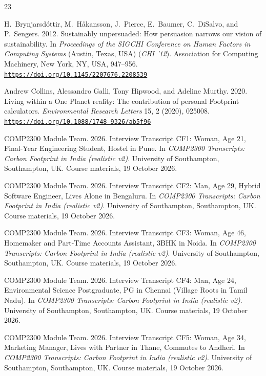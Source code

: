 \documentclass[12pt, a4paper]{article}
\newcommand{\doi}[1]{\href{https://doi.org/#1}{\nolinkurl{https://doi.org/#1}}}
\begin{document}
\begin{thebibliography}{23}
\footnotesize

H.~Brynjarsd\'{o}ttir, M.~H\aa kansson, J.~Pierce, E.~Baumer, C.~DiSalvo, and P.~Sengers. 2012. Sustainably unpersuaded: How persuasion narrows our vision of sustainability. In \textit{Proceedings of the SIGCHI Conference on Human Factors in Computing Systems} (Austin, Texas, USA) (\textit{CHI '12}). Association for Computing Machinery, New York, NY, USA, 947--956. \doi{10.1145/2207676.2208539}

Andrew Collins, Alessandro Galli, Tony Hipwood, and Adeline Murthy. 2020. Living within a One Planet reality: The contribution of personal Footprint calculators. \textit{Environmental Research Letters} 15, 2 (2020), 025008. \doi{10.1088/1748-9326/ab5f96}

COMP2300 Module Team. 2026. Interview Transcript CF1: Woman, Age 21, Final-Year Engineering Student, Hostel in Pune. In \textit{COMP2300 Transcripts: Carbon Footprint in India (realistic v2)}. University of Southampton, Southampton, UK. Course materials, 19 October 2026.

COMP2300 Module Team. 2026. Interview Transcript CF2: Man, Age 29, Hybrid Software Engineer, Lives Alone in Bengaluru. In \textit{COMP2300 Transcripts: Carbon Footprint in India (realistic v2)}. University of Southampton, Southampton, UK. Course materials, 19 October 2026.

COMP2300 Module Team. 2026. Interview Transcript CF3: Woman, Age 46, Homemaker and Part-Time Accounts Assistant, 3BHK in Noida. In \textit{COMP2300 Transcripts: Carbon Footprint in India (realistic v2)}. University of Southampton, Southampton, UK. Course materials, 19 October 2026.

COMP2300 Module Team. 2026. Interview Transcript CF4: Man, Age 24, Environmental Science Postgraduate, PG in Chennai (Village Roots in Tamil Nadu). In \textit{COMP2300 Transcripts: Carbon Footprint in India (realistic v2)}. University of Southampton, Southampton, UK. Course materials, 19 October 2026.

COMP2300 Module Team. 2026. Interview Transcript CF5: Woman, Age 34, Marketing Manager, Lives with Partner in Thane, Commutes to Andheri. In \textit{COMP2300 Transcripts: Carbon Footprint in India (realistic v2)}. University of Southampton, Southampton, UK. Course materials, 19 October 2026.


\end{thebibliography}
\end{document}
